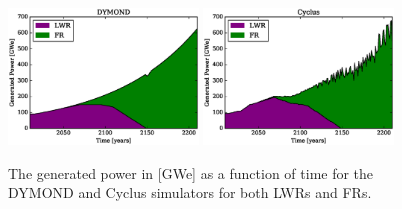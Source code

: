 \begin{figure}[htb]
\centering
\includegraphics[width=0.45\textwidth]{gwe-dymond.eps}
\includegraphics[width=0.45\textwidth]{gwe-cyclus.eps}
\caption{The generated power in [GWe] as a function of time for the DYMOND and 
Cyclus simulators for both LWRs and FRs.}
\label{gwe-simulators}
\end{figure}

\clearpage
